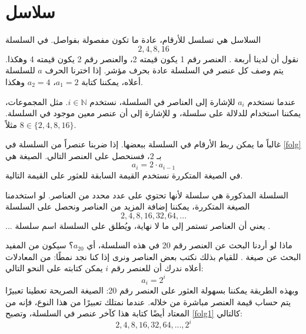 



\usepackage{datetime2}
\usepackage[]{hyperref}

\usepackage{polyglossia}
\setdefaultlanguage{arabic}
\setmainfont{Amiri}


\small
\section{سلاسل}
السلاسل هي تسلسل للأرقام، عادة ما تكون مفصولة بفواصل. في السلسلة
\begin{equation}
	2, 4, 8, 16  \label{folg}
\end{equation}
نقول أن لدينا أربعة . العنصر رقم 1 يكون قيمته 2، والعنصر رقم 2 يكون قيمته 4 وهكذا. يتم وصف كل عنصر في السلسلة عادة بحرف مؤشر. إذا اخترنا الحرف \( a \) للسلسلة أعلاه، يمكننا كتابة \( a_1 = 2 \)، \( a_2 = 4 \) وهكذا.\vsk

عندما نستخدم \( a_i \) للإشارة إلى العناصر في السلسلة، نستخدم \( {i\in \mathbb{N}} \). مثل المجموعات، يمكننا استخدام \sym{$ \lbrace\rbrace $} للدلالة على سلسلة، و \sym{$ \in $} للإشارة إلى أن عنصر معين موجود في السلسلة. مثلاً \( 8\in\lbrace2, 4, 8, 16\rbrace \).\vsk

غالباً ما يمكن ربط الأرقام في السلسلة ببعضها. إذا ضربنا عنصراً من السلسلة في \eqref{folg} بـ \( 2 \)، فسنحصل على العنصر التالي. الصيغة  هي
\[ a_i = 2\cdot a_{i-1} \]
في الصيغة المتكررة نستخدم القيمة السابقة للعثور على القيمة التالية.\vsk

السلسلة المذكورة هي سلسلة  لأنها تحتوي على عدد محدد من العناصر. لو استخدمنا الصيغة المتكررة، يمكننا إضافة المزيد من العناصر ونحصل على السلسلة
\begin{equation}
	2, 4, 8, 16, 32, 64, ...  \label{folg1}
\end{equation}
\( ... \) يعني أن العناصر تستمر إلى ما لا نهاية، ويُطلق على السلسلة اسم سلسلة .\vsk

ماذا لو أردنا البحث عن العنصر رقم 20 في هذه السلسلة، أي \( a_{20} \)؟ سيكون من المفيد البحث عن صيغة . للقيام بذلك نكتب بعض العناصر ونرى إذا كنا نجد نمطًا:
من المعادلات أعلاه ندرك أن للعنصر رقم \( i \) يمكن كتابته على النحو التالي:
\[ a_i=2^i \]
وبهذه الطريقة يمكننا بسهولة العثور على العنصر رقم 20:
الصيغة الصريحة تعطينا تعبيرًا يتم حساب قيمة العنصر مباشرة من خلاله. عندما نمتلك تعبيرًا من هذا النوع، فإنه من المعتاد أيضًا كتابة هذا كآخر عنصر في السلسلة، وتصبح \eqref{folg1} كالتالي:
\[  2, 4, 8, 16, 32, 64, ..., 2^i \]


